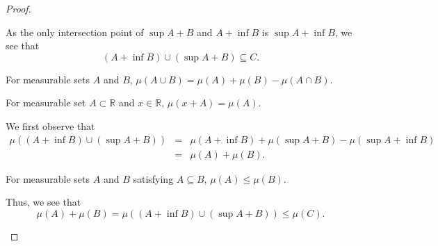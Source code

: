 \begin{proof}
\begin{enumerate}
        As the only intersection point of \(\sup A + B\) and \(A + \inf B\) is \(\sup A + \inf B\), we see that
        \begin{equation*}
            (A + \inf B) \cup (\sup A + B) \subseteq C.
        \end{equation*}
        {
        \begin{lemma}
            For measurable sets \(A\) and \(B\),
            \(\mu(A \cup B) = \mu(A) + \mu(B) - \mu(A \cap B)\).
        \end{lemma}
        \begin{lemma}
            For measurable set \(A\subset \mathbb{R}\) and \(x \in \mathbb{R}\), \(\mu(x+A) = \mu(A)\).
        \end{lemma}
        }
        We first observe that
        \begin{eqnarray*}
            \mu\left((A+\inf B) \cup (\sup A + B)\right) & = & \mu(A+\inf B) + \mu(\sup A + B) - \mu(\sup A + \inf B)\\
            & = & \mu(A) + \mu(B).
        \end{eqnarray*}
        {
        \begin{lemma}
            For measurable sets \(A\) and \(B\) satisfying \(A \subseteq B\), \(\mu(A) \leq \mu(B)\).
        \end{lemma}
        }
        Thus, we see that
        \begin{equation*}
            \mu(A) + \mu(B) = \mu\left((A+\inf B) \cup (\sup A + B)\right) \leq \mu(C).
        \end{equation*}
    \end{enumerate}
\end{proof}